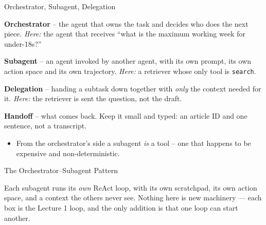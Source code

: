 \begin{frame}{Orchestrator, Subagent, Delegation}
\begin{rldefinition}
\textbf{Orchestrator} -- the agent that owns the task and decides who does the next piece. \emph{Here:} the agent that receives ``what is the maximum working week for under-18s?''

\smallskip
\textbf{Subagent} -- an agent invoked by another agent, with its own prompt, its own action space and its own trajectory. \emph{Here:} a retriever whose only tool is \texttt{search}.

\smallskip
\textbf{Delegation} -- handing a subtask down together with \emph{only} the context needed for it. \emph{Here:} the retriever is sent the question, not the draft.

\smallskip
\textbf{Handoff} -- what comes back. Keep it small and typed: an article ID and one sentence, not a transcript.
\end{rldefinition}
\pause
\begin{itemize}
  \item From the orchestrator's side a subagent \emph{is} a tool -- one that happens to be expensive and non-deterministic.
\end{itemize}
\end{frame}

\begin{frame}{The Orchestrator--Subagent Pattern}
\centering
{}

\vspace{0.6em}
\footnotesize
Each subagent runs its \emph{own} ReAct loop, with its own scratchpad, its own action space, and a
context the others never see. Nothing here is new machinery --- each box is the Lecture 1 loop, and
the only addition is that one loop can start another.
\end{frame}

